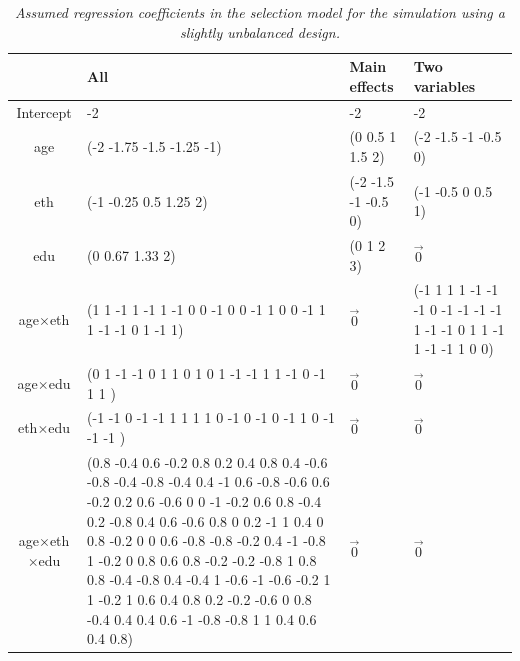 \documentclass[11pt]{article}
\numberwithin{figure}{section}
\numberwithin{table}{section}
\numberwithin{equation}{section}
\begin{document}
\begin{table}
\begin{center}
\caption{\em Assumed regression coefficients in the {\em selection}  model for the simulation using a slightly unbalanced design.}
\label{s1-selection-coef}
\small
\begin{tabular}{c|p{4cm}|l|p{4cm}}
&All&Main effects & Two variables\\
\hline
Intercept&-2&-2&-2\\
age&(-2 -1.75 -1.5 -1.25 -1)&(0 0.5 1 1.5 2)&(-2 -1.5 -1 -0.5 0)\\
eth&(-1 -0.25 0.5 1.25 2)&(-2 -1.5 -1 -0.5 0)&(-1 -0.5 0 0.5 1)\\
edu&(0 0.67 1.33 2)&(0 1 2 3)& $\vec{0}$\\
age$\times$eth&(1 1 -1 1 -1 1 -1 0 0 -1 0 0 -1 1 0 0 -1 1 1 -1 -1 0 1 -1 1)& $\vec{0}$&(-1 1 1 1 -1 -1 -1 0 -1 -1 -1 -1 1 -1 -1 0 1 1 -1 1 -1 -1 1 0 0)\\
age$\times$edu&(0 1 -1 -1 0 1 1 0 1 0 1 -1 -1 1 1 -1 0 -1 1 1 )& $\vec{0}$& $\vec{0}$\\
eth$\times$edu&(-1 -1 0 -1 -1 1 1 1 1 0 -1 0 -1 0 -1 1 0 -1 -1 -1 )& $\vec{0}$& $\vec{0}$\\
age$\times$eth$\times$edu& (0.8 -0.4 0.6 -0.2 0.8 0.2 0.4 0.8 0.4 -0.6 -0.8 -0.4 -0.8 -0.4 0.4 -1 0.6 -0.8 -0.6 0.6 -0.2 0.2 0.6 -0.6 0 0 -1 -0.2 0.6 0.8 -0.4 0.2 -0.8 0.4 0.6 -0.6 0.8 0 0.2 -1 1 0.4 0 0.8 -0.2 0 0 0.6 -0.8 -0.8 -0.2 0.4 -1 -0.8 1 -0.2 0 0.8 0.6 0.8 -0.2 -0.2 -0.8 1 0.8 0.8 -0.4 -0.8 0.4 -0.4 1 -0.6 -1 -0.6 -0.2 1 1 -0.2 1 0.6 0.4 0.8 0.2 -0.2 -0.6 0 0.8 -0.4 0.4 0.4 0.6 -1 -0.8 -0.8 1 1 0.4 0.6 0.4 0.8)&$\vec{0}$& $\vec{0}$
\end{tabular}
\end{center}
\end{table}
\end{document}

